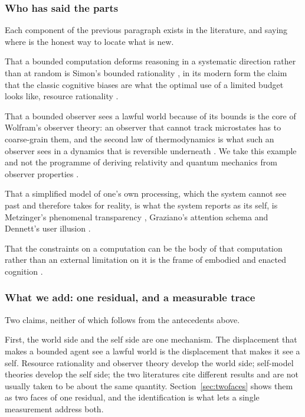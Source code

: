 \subsubsection{Who has said the parts}

Each component of the previous paragraph exists in the literature, and saying where is the honest way to
locate what is new.

That a bounded computation deforms reasoning in a systematic direction rather than at random is
Simon's bounded rationality \citep{simon1955}, in its modern form the claim that the classic cognitive
biases are what the optimal use of a limited budget looks like, resource rationality
\citep{lieder2020,griffiths2015}.

That a bounded observer sees a lawful world because of its bounds is the core of Wolfram's observer
theory: an observer that cannot track microstates has to coarse-grain them, and the second law of
thermodynamics is what such an observer sees in a dynamics that is reversible underneath
\citep{wolfram2023}. We take this example and not the programme of deriving relativity and quantum
mechanics from observer properties \citep{wolfram2020}.

That a simplified model of one's own processing, which the system cannot see past and therefore takes
for reality, is what the system reports as its self, is Metzinger's phenomenal transparency
\citep{metzinger2003}, Graziano's attention schema \citep{graziano2011,graziano2013} and Dennett's user
illusion \citep{dennett1991}.

That the constraints on a computation can be the body of that computation rather than an external
limitation on it is the frame of embodied and enacted cognition \citep{varela1991}.

\subsubsection{What we add: one residual, and a measurable trace}
\label{sec:contribution}

Two claims, neither of which follows from the antecedents above.

First, the world side and the self side are one mechanism. The displacement that makes a bounded agent
see a lawful world is the displacement that makes it see a self. Resource rationality and observer
theory develop the world side; self-model theories develop the self side; the two literatures cite
different results and are not usually taken to be about the same quantity. Section~\ref{sec:twofaces} shows them as two faces
of one residual, and the identification is what lets a single measurement address both.

